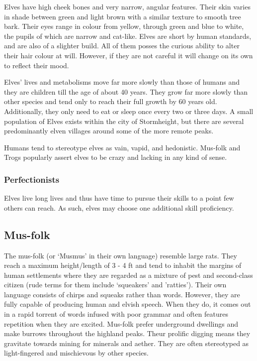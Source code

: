 \documentclass[a4paper,11pt,oneside]{book}
\begin{document}
Elves have high cheek bones and very narrow, angular features. Their skin varies in shade between green and light brown with a similar texture to smooth tree bark. Their eyes range in colour from yellow, through green and blue to white, the pupils of which are narrow and cat-like. Elves are short by human standards, and are also of a slighter build. All of them posses the curious ability to alter their hair colour at will. However, if they are not careful it will change on its own to reflect their mood. 

Elves' lives and metabolisms move far more slowly than those of humans and they are children till the age of about 40 years. They grow far more slowly than other species and tend only to reach their full growth by 60 years old. Additionally, they only need to eat or sleep once every two or three days. A small population of Elves exists within the city of Stormheight, but there are several predominantly elven villages around some of the more remote peaks. 

Humans tend to stereotype elves as vain, vapid, and hedonistic. Mus-folk and Trogs popularly assert elves to be crazy and lacking in any kind of sense. 

\subsubsection*{Perfectionists}
Elves live long lives and thus have time to pursue their skills to a point few others can reach. As such, elves may choose one additional skill proficiency.


\subsection{Mus-folk}
The mus-folk (or `Musmus' in their own language) resemble large rats. They reach a maximum height/length of 3 - 4 ft and tend to inhabit the margins of human settlements where they are regarded as a mixture of pest and second-class citizen (rude terms for them include `squeakers' and 'ratties'). Their own language consists of chirps and squeaks rather than words. However, they are fully capable of producing human and elvish speech. When they do, it comes out in a rapid torrent of words infused with poor grammar and often features repetition when they are excited. Mus-folk prefer underground dwellings and make burrows throughout the highland peaks. Theur prolific digging means they gravitate towards mining for minerals and aether. They are often stereotyped as light-fingered and mischievous by other species.  
\end{document}
